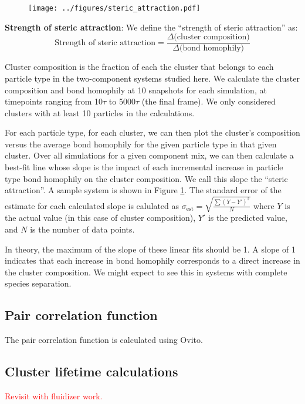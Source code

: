 \begin{figure}[t]
\begin{center}
\texttt{[image: ../figures/steric\_attraction.pdf]}
\caption{}
\label{fig:steric_attraction}
\end{center}
\end{figure}

\textbf{Strength of steric attraction}: We define the ``strength of steric attraction'' as:
\begin{equation}
\text{Strength of steric attraction} = \frac{\Delta\text{(cluster composition)}}{\Delta\text{(bond homophily)}}
\end{equation}

Cluster composition is the fraction of each the cluster that belongs to each particle type in the two-component systems studied here.
We calculate the cluster composition and bond homophily at 10 snapshots for each simulation, at timepoints ranging from 10$\tau$ to 5000$\tau$ (the final frame).
We only considered clusters with at least 10 particles in the calculations.

For each particle type, for each cluster, we can then plot the cluster's composition versus the average bond homophily for the given particle type in that given cluster.
Over all simulations for a given component mix, we can then calculate a best-fit line whose slope is the impact of each incremental increase in particle type bond homophily on the cluster composition.
We call this slope the ``steric attraction''.
A sample system is shown in Figure \ref{fig:steric_attraction}.
The standard error of the estimate for each calculated slope is calulated as $\sigma_\text{est}=\sqrt{\frac{\sum(Y-Y')^2}{N}}$ where $Y$ is the actual value (in this case of cluster composition), $Y'$ is the predicted value, and $N$ is the number of data points.

In theory, the maximum of the slope of these linear fits should be 1.
A slope of 1 indicates that each increase in bond homophily corresponds to a direct increase in the cluster composition.
We might expect to see this in systems with complete species separation.

\subsection{Pair correlation function}
The pair correlation function is calculated using Ovito\cite{Ovito}.

\subsection{Cluster lifetime calculations}
\textcolor{red}{Revisit with fluidizer work.}

